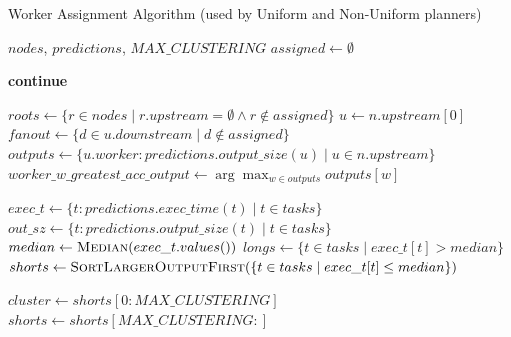 \documentclass[conference]{IEEEtran}
\begin{document}
\begin{algorithm}
    \caption{Worker Assignment Algorithm (used by Uniform and Non-Uniform planners)}
    \label{alg:worker_assignment}
    \small
    \begin{algorithmic}[1]
    \Require $nodes$, $predictions$, $MAX\_CLUSTERING$
    \State $assigned \gets \emptyset$
    
            \State \textbf{continue}
        \EndIf
        
         
            \State $roots \gets \{r \in nodes \mid r.upstream = \emptyset \land r \notin assigned\}$
            \State {}
         
            \State $u \gets n.upstream[0]$
                \State {} 
            \Else {}
                \State $fanout \gets \{d \in u.downstream \mid d \notin assigned\}$
                \State {}
            \EndIf
        \Else {}
            \State $outputs \gets \{u.worker: predictions.output\_size(u) \mid u \in n.upstream\}$
            \State $worker\_w\_greatest\_acc\_output \gets \arg\max_{w \in outputs} outputs[w]$
            \State {}
        \EndIf
    \EndFor
    
    \Statex
    
            \Return
        \EndIf
        
        \State $exec\_t \gets \{t: predictions.exec\_time(t) \mid t \in tasks\}$
        \State $out\_sz \gets \{t: predictions.output\_size(t) \mid t \in tasks\}$
        \State $median \gets \textsc{Median}(exec\_t.values())$
        \State $longs \gets \{t \in tasks \mid exec\_t[t] > median\}$
        \State $shorts \gets \textsc{SortLargerOutputFirst}(\{t \in tasks \mid exec\_t[t] \leq median\})$
        
        \Statex
        \State {}
            \State $cluster \gets shorts[0:MAX\_CLUSTERING]$
            \State {}
            \State $shorts \gets shorts[MAX\_CLUSTERING:]$
        \EndIf
        

\end{algorithmic}
\end{algorithm}
\end{document}
